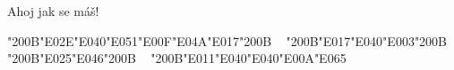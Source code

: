 \documentclass[12pt]{article}
\begin{document}
\charisfont
\noindent

\bigskip

​Ahoj jak se máš!


\bigskip \bigskip
\newpage

\tengwarfont
\sloppy  %
\noindent


\bigskip
\raggedright %

\Large\char"200B{\color{red}\char"E02E\char"E040\char"E051}\char"E00F\char"E04A\char"E017\char"200B \mbox{ } \char"200B\char"E017\char"E040\char"E003\char"200B \mbox{ } \char"200B\char"E025\char"E046\char"200B \mbox{ } \char"200B\char"E011\char"E040\char"E040\char"E00A\char"E065
\end{document}
